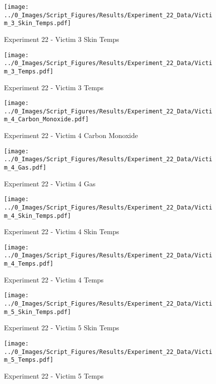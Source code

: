 	\begin{figure}[H]
		\centering
		\texttt{[image: ../0\_Images/Script\_Figures/Results/Experiment\_22\_Data/Victim\_3\_Skin\_Temps.pdf]}
		\caption[]{Experiment 22 - Victim 3 Skin Temps}
	\end{figure}
 
	\clearpage

	\begin{figure}[H]
		\centering
		\texttt{[image: ../0\_Images/Script\_Figures/Results/Experiment\_22\_Data/Victim\_3\_Temps.pdf]}
		\caption[]{Experiment 22 - Victim 3 Temps}
	\end{figure}
 

	\begin{figure}[H]
		\centering
		\texttt{[image: ../0\_Images/Script\_Figures/Results/Experiment\_22\_Data/Victim\_4\_Carbon\_Monoxide.pdf]}
		\caption[]{Experiment 22 - Victim 4 Carbon Monoxide}
	\end{figure}
 
	\clearpage

	\begin{figure}[H]
		\centering
		\texttt{[image: ../0\_Images/Script\_Figures/Results/Experiment\_22\_Data/Victim\_4\_Gas.pdf]}
		\caption[]{Experiment 22 - Victim 4 Gas}
	\end{figure}
 

	\begin{figure}[H]
		\centering
		\texttt{[image: ../0\_Images/Script\_Figures/Results/Experiment\_22\_Data/Victim\_4\_Skin\_Temps.pdf]}
		\caption[]{Experiment 22 - Victim 4 Skin Temps}
	\end{figure}
 
	\clearpage

	\begin{figure}[H]
		\centering
		\texttt{[image: ../0\_Images/Script\_Figures/Results/Experiment\_22\_Data/Victim\_4\_Temps.pdf]}
		\caption[]{Experiment 22 - Victim 4 Temps}
	\end{figure}
 

	\begin{figure}[H]
		\centering
		\texttt{[image: ../0\_Images/Script\_Figures/Results/Experiment\_22\_Data/Victim\_5\_Skin\_Temps.pdf]}
		\caption[]{Experiment 22 - Victim 5 Skin Temps}
	\end{figure}
 
	\clearpage

	\begin{figure}[H]
		\centering
		\texttt{[image: ../0\_Images/Script\_Figures/Results/Experiment\_22\_Data/Victim\_5\_Temps.pdf]}
		\caption[]{Experiment 22 - Victim 5 Temps}
	\end{figure}
 

